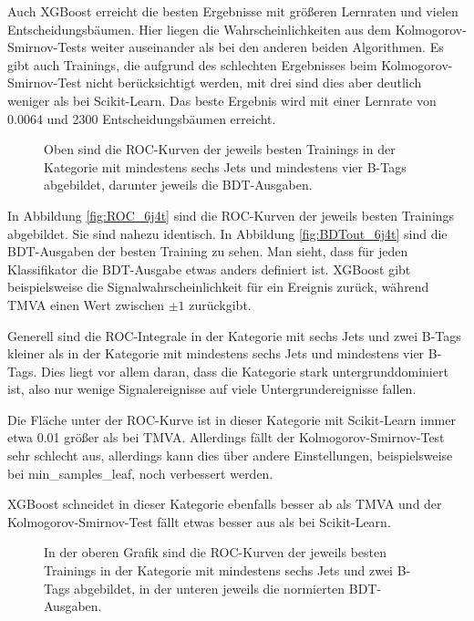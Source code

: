 Auch XGBoost erreicht die besten Ergebnisse mit gr\"o\ss eren Lernraten und vielen Entscheidungsb\"aumen. Hier liegen die Wahrscheinlichkeiten aus dem Kolmogorov-Smirnov-Tests weiter auseinander als bei den anderen beiden Algorithmen. Es gibt auch Trainings, die aufgrund des schlechten Ergebnisses beim Kolmogorov-Smirnov-Test nicht ber\"ucksichtigt werden, mit drei sind dies aber deutlich weniger als bei Scikit-Learn. Das beste Ergebnis wird mit einer Lernrate von \num{0,0064} und \num{2300} Entscheidungsb\"aumen erreicht.

\begin{figure}[tbp]
\centering     %
{}
\parbox[b]{12cm}{
\caption{Oben sind die ROC-Kurven der jeweils besten Trainings in der Kategorie mit mindestens sechs Jets und mindestens vier B-Tags abgebildet, darunter jeweils die BDT-Ausgaben.}}
\end{figure}

In Abbildung \ref{fig:ROC_6j4t} sind die ROC-Kurven der jeweils besten Trainings abgebildet. Sie sind nahezu identisch. In Abbildung \ref{fig:BDTout_6j4t} sind die BDT-Ausgaben der besten Training zu sehen. Man sieht, dass f\"ur jeden Klassifikator die BDT-Ausgabe etwas anders definiert ist. XGBoost gibt beispielsweise die Signalwahrscheinlichkeit f\"ur ein Ereignis zur\"uck, w\"ahrend TMVA einen Wert zwischen $\pm1$ zur\"uckgibt.

Generell sind die ROC-Integrale in der Kategorie mit sechs Jets und zwei B-Tags kleiner als in der Kategorie mit mindestens sechs Jets und mindestens vier B-Tags. Dies liegt vor allem daran, dass die Kategorie stark untergrunddominiert ist, also nur wenige Signalereignisse auf viele Untergrundereignisse fallen.

Die Fl\"ache unter der ROC-Kurve ist in dieser Kategorie mit Scikit-Learn immer etwa \num{0,01} gr\"o\ss er als bei TMVA. Allerdings f\"allt der Kolmogorov-Smirnov-Test sehr schlecht aus, allerdings kann dies \"uber andere Einstellungen, beispielsweise bei min\_samples\_leaf, noch verbessert werden.

XGBoost schneidet in dieser Kategorie ebenfalls besser ab als TMVA und der Kolmogorov-Smirnov-Test f\"allt etwas besser aus als bei Scikit-Learn.

\begin{figure}[tbp]
\centering     %
{}
\parbox[b]{12cm}{
\caption{In der oberen Grafik sind die ROC-Kurven der jeweils besten Trainings in der Kategorie mit mindestens sechs Jets und zwei B-Tags abgebildet, in der unteren jeweils die normierten BDT-Ausgaben.}}
\end{figure}

